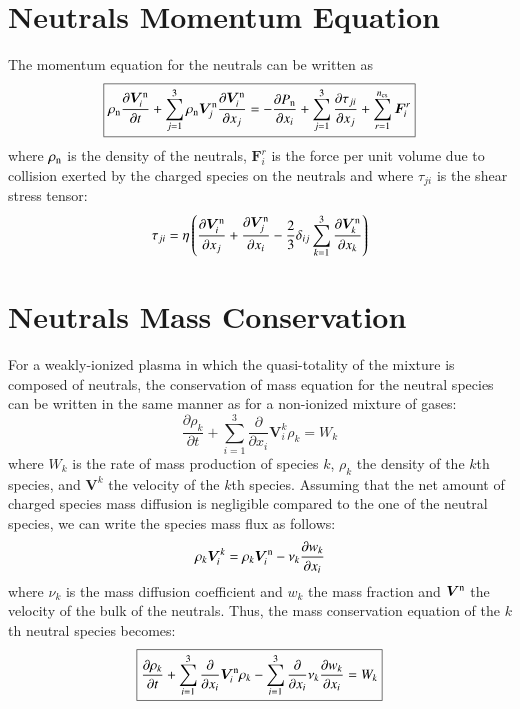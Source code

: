 \documentclass{warpdoc}
\newcommand\frameeqn[1]{\fbox{$\displaystyle #1$}}
\newcommand{\ncs}{{n_{\rm cs}}}
\newcommand{\visc}{\eta}
\renewcommand{\vec}[1]{\bm{#1}}
\begin{document}
\section{Neutrals Momentum Equation}

The momentum equation for the neutrals can be written as
%
\begin{equation}
\frameeqn{
  \rho_{\rm n} \frac{\partial \vec{V}_i^{\rm n} }{\partial t}+ \sum_{j=1}^3 \rho_{\rm n} \vec{V}_j^{\rm n} \frac{\partial \vec{V}_i^{\rm n}}{\partial x_j}
=
-\frac{\partial P_{\rm n}}{\partial x_i} 
+ \sum_{j=1}^3 \frac{\partial \tau_{ji}}{\partial x_j}
+ \sum_{r=1}^\ncs \vec{F}_i^r
}
\label{eqn:momentumneutral}
\end{equation}
%
where $\rho_{\rm n}$ is the density of the neutrals, $\vec{F}_i^r$  is the force per unit volume due to collision exerted by the charged species on the neutrals and where $\tau_{ji}$ is the shear stress tensor:
%
\begin{equation}
\tau_{ji} = \visc  \left( \frac{\partial \vec{V}^{\rm n}_i}{\partial x_j} + \frac{\partial \vec{V}^{\rm n}_j}{\partial x_i} - \frac{2}{3} \delta_{ij} \sum_{k=1}^3 \frac{\partial \vec{V}^{\rm n}_k}{\partial x_k} \right)
\label{eqn:shearstress}
\end{equation}
%






\section{Neutrals Mass Conservation}

For a weakly-ionized plasma in which the quasi-totality of the mixture is composed of neutrals, the conservation of mass equation for the neutral species can be written in the same manner as for a non-ionized mixture of gases:
%
\begin{equation}
  \frac{\partial \rho_k}{\partial t} + \sum_{i=1}^3 \frac{\partial}{\partial x_i} \vec{V}_i^{k} \rho_k = W_k
\end{equation}
%
where $W_k$ is the rate of mass production of species $k$, $\rho_k$ the density of the $k$th species, and $\vec{V}^{k}$ the velocity of the $k$th species. Assuming that the net amount of charged species mass diffusion is negligible compared to the one of the neutral species, we can write the species mass flux as follows:
%
\begin{equation}
\rho_k \vec{V}^k_i=\rho_k \vec{V}^{\rm n}_i - \nu_k \frac{\partial w_k}{\partial x_i}
\end{equation}
%  
where $\nu_k$ is the mass diffusion coefficient and $w_k$ the mass fraction and $\vec{V}^{\rm n}$ the velocity of the bulk of the neutrals. Thus, the mass conservation equation of the $k$th neutral species becomes:
%
\begin{equation}
\frameeqn{
  \frac{\partial \rho_k}{\partial t} + \sum_{i=1}^3 \frac{\partial}{\partial x_i} \vec{V}_i^{\rm n} \rho_k 
- \sum_{i=1}^3 \frac{\partial}{\partial x_i} \nu_k \frac{\partial w_k}{\partial x_i}= W_k
}
\label{eqn:massneutral}
\end{equation}
%
\end{document}
